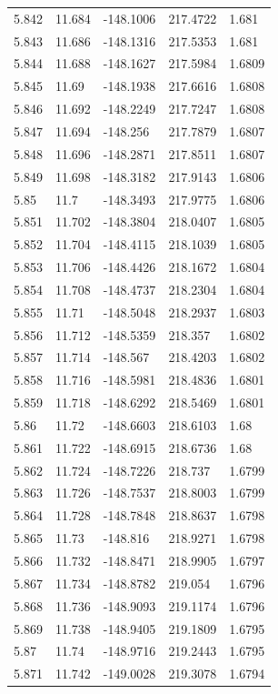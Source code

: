 \begin{tabular}{lllll}
5.842 & 11.684 & -148.1006 & 217.4722 & 1.681 \\
5.843 & 11.686 & -148.1316 & 217.5353 & 1.681 \\
5.844 & 11.688 & -148.1627 & 217.5984 & 1.6809 \\
5.845 & 11.69 & -148.1938 & 217.6616 & 1.6808 \\
5.846 & 11.692 & -148.2249 & 217.7247 & 1.6808 \\
5.847 & 11.694 & -148.256 & 217.7879 & 1.6807 \\
5.848 & 11.696 & -148.2871 & 217.8511 & 1.6807 \\
5.849 & 11.698 & -148.3182 & 217.9143 & 1.6806 \\
5.85 & 11.7 & -148.3493 & 217.9775 & 1.6806 \\
5.851 & 11.702 & -148.3804 & 218.0407 & 1.6805 \\
5.852 & 11.704 & -148.4115 & 218.1039 & 1.6805 \\
5.853 & 11.706 & -148.4426 & 218.1672 & 1.6804 \\
5.854 & 11.708 & -148.4737 & 218.2304 & 1.6804 \\
5.855 & 11.71 & -148.5048 & 218.2937 & 1.6803 \\
5.856 & 11.712 & -148.5359 & 218.357 & 1.6802 \\
5.857 & 11.714 & -148.567 & 218.4203 & 1.6802 \\
5.858 & 11.716 & -148.5981 & 218.4836 & 1.6801 \\
5.859 & 11.718 & -148.6292 & 218.5469 & 1.6801 \\
5.86 & 11.72 & -148.6603 & 218.6103 & 1.68 \\
5.861 & 11.722 & -148.6915 & 218.6736 & 1.68 \\
5.862 & 11.724 & -148.7226 & 218.737 & 1.6799 \\
5.863 & 11.726 & -148.7537 & 218.8003 & 1.6799 \\
5.864 & 11.728 & -148.7848 & 218.8637 & 1.6798 \\
5.865 & 11.73 & -148.816 & 218.9271 & 1.6798 \\
5.866 & 11.732 & -148.8471 & 218.9905 & 1.6797 \\
5.867 & 11.734 & -148.8782 & 219.054 & 1.6796 \\
5.868 & 11.736 & -148.9093 & 219.1174 & 1.6796 \\
5.869 & 11.738 & -148.9405 & 219.1809 & 1.6795 \\
5.87 & 11.74 & -148.9716 & 219.2443 & 1.6795 \\
5.871 & 11.742 & -149.0028 & 219.3078 & 1.6794 \\

\end{tabular}
